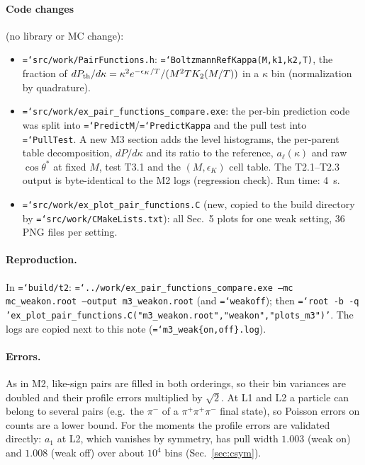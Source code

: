 \documentclass[11pt,a4paper]{article}
\newcommand{\code}[1]{\texttt{\hyphenchar\font=`\-#1}}
\begin{document}
\paragraph{Code changes} (no library or MC change):
\begin{itemize}\itemsep0pt
\item \code{src/work/PairFunctions.h}: \code{BoltzmannRefKappa(M,k1,k2,T)}, the fraction of
  $dP_{\rm th}/d\kappa=\kappa^2e^{-\epsilon_K/T}/(M^2TK_2(M/T))$ in a $\kappa$ bin (normalization by
  quadrature).
\item \code{src/work/ex\_pair\_functions\_compare.exe}: the per-bin prediction code was split into
  \code{PredictM}/\code{PredictKappa} and the pull test into \code{PullTest}. A new M3 section adds the
  level histograms, the per-parent table decomposition, $dP/d\kappa$ and its ratio to the reference,
  $a_\ell(\kappa)$ and raw $\cos\theta^*$ at fixed $M$, test T3.1 and the $(M,\epsilon_K)$ cell table.
  The T2.1--T2.3 output is byte-identical to the M2 logs (regression check). Run time: 4~s.
\item \code{src/work/ex\_plot\_pair\_functions.C} (new, copied to the build directory by
  \code{src/work/CMakeLists.txt}): all Sec.~5 plots for one weak setting, 36 PNG files per setting.
\end{itemize}

\paragraph{Reproduction.} In \code{build/t2}:
\code{../work/ex\_pair\_functions\_compare.exe --mc mc\_weakon.root --output m3\_weakon.root} (and
\code{weakoff}); then \code{root -b -q 'ex\_plot\_pair\_functions.C("m3\_weakon.root","weakon","plots\_m3")'}.
The logs are copied next to this note (\code{m3\_weak\{on,off\}.log}).

\paragraph{Errors.} As in M2, like-sign pairs are filled in both orderings, so their bin variances
are doubled and their profile errors multiplied by $\sqrt2$. At L1 and L2 a particle can belong to
several pairs (e.g.\ the $\pi^-$ of a $\pi^+\pi^+\pi^-$ final state), so Poisson errors on counts are
a lower bound. For the moments the profile errors are validated directly: $a_1$ at L2, which
vanishes by symmetry, has pull width $1.003$ (weak on) and $1.008$ (weak off) over about $10^4$
bins (Sec.~\ref{sec:csym}).
\end{document}
